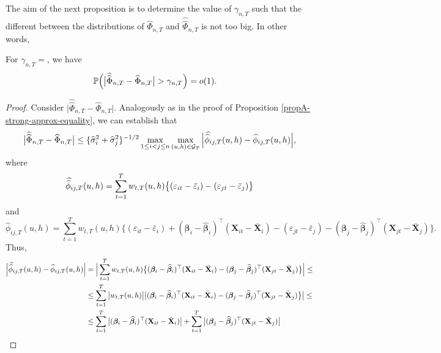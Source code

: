 \documentclass[a4paper,12pt]{article}
\newcommand{\doublehat}[1]{\skew{5.5}\widehat{\widehat{#1}}}
\newcommand{\doublehattwo}[1]{\widehat{\widehat{#1}}}
\begin{document}
The aim of the next proposition is to determine the value of $\gamma_{n, T}$ such that the different between the distributions of $\widehat{\Phi}_{n, T}$ and $\doublehattwo{\Phi}_{n, T}$ is not too big. In other words,

\begin{propA}\label{propA-intermediate-relation-2}
For $\gamma_{n, T} = $, we have
\begin{align*} \pr \Big(\big|\doublehattwo{\Phi}_{n,T} &- \widehat{\Phi}_{n,T}\big| > \gamma_{n, T} \Big) = o(1).
\end{align*}
\end{propA}
\begin{proof}
Consider $\big|\doublehattwo{\Phi}_{n,T} - \widehat{\Phi}_{n,T}\big|$. Analogously as in the proof of Proposition \ref{propA-strong-approx-equality}, we can establish that
\begin{align*}
\big| \doublehattwo{\Phi}_{n, T} - \widehat{\Phi}_{n, T} \big| \le \{\widehat{\sigma}_i^2 + \widehat{\sigma}_j^2 \}^{-1/2} \max_{1\le i < j \le n} \max_{(u,h) \in \mathcal{G}_T} \Big| \doublehat{\phi}_{ij, T}(u,h) - \widehat{\phi}_{ij, T}(u,h) \Big|,
\end{align*}
where 
\[\doublehat{\phi}_{ij,T}(u,h) = \sum_{t=1}^T w_{t,T}(u,h) \big\{ (\varepsilon_{it} - \bar{\varepsilon}_i) - (\varepsilon_{jt} - \bar{\varepsilon}_j)  \big\} \]
and 
\[\widehat{\phi}_{ij,T}(u,h) = \sum_{t=1}^T w_{t,T}(u,h) \big\{ (\varepsilon_{it} - \bar{\varepsilon}_i) + (\bm{\beta}_i - \widehat{\bm{\beta}}_i)^\top (\mathbf{X}_{it} - \bar{\mathbf{X}}_{i}) - (\varepsilon_{jt} - \bar{\varepsilon}_j) - (\bm{\beta}_j - \widehat{\bm{\beta}}_j)^\top (\mathbf{X}_{jt} - \bar{\mathbf{X}}_{j}) \big\}.\]
Thus, 
\begin{align*}
\Big| \doublehat{\phi}_{ij, T}(u,h) - \widehat{\phi}_{ij, T}(u,h) \Big| & =\Big| \sum_{t=1}^T w_{t,T}(u,h) \big\{ (\bm{\beta}_i - \widehat{\bm{\beta}}_i)^\top (\mathbf{X}_{it} - \bar{\mathbf{X}}_{i}) - (\bm{\beta}_j - \widehat{\bm{\beta}}_j)^\top (\mathbf{X}_{jt} - \bar{\mathbf{X}}_{j}) \big\} \Big| \le \\
&\le  \sum_{t=1}^T \big|w_{t,T}(u,h)\big| \big| (\bm{\beta}_i - \widehat{\bm{\beta}}_i)^\top (\mathbf{X}_{it} - \bar{\mathbf{X}}_{i})  -(\bm{\beta}_j - \widehat{\bm{\beta}}_j)^\top (\mathbf{X}_{jt} - \bar{\mathbf{X}}_{j}) \big\} \big| \le\\
&\le  \sum_{t=1}^T \big| (\bm{\beta}_i - \widehat{\bm{\beta}}_i)^\top (\mathbf{X}_{it} - \bar{\mathbf{X}}_{i}) \big| + \sum_{t=1}^T \big| (\bm{\beta}_j - \widehat{\bm{\beta}}_j)^\top (\mathbf{X}_{jt} - \bar{\mathbf{X}}_{j}) \big|

\end{align*}
\end{proof}
\end{document}

